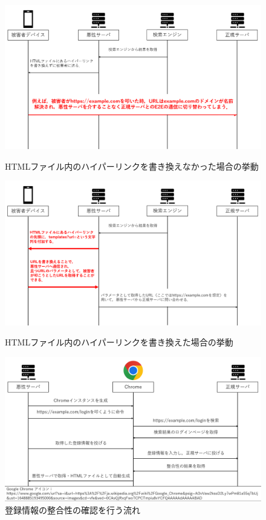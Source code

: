 \documentclass[dvipdfmx,twocolumn]{jsarticle}
\begin{document}
                \begin{figure}[t]
                    \centering
                    \includegraphics[width=12cm]{img/vc-vf-4-5-00.png}
                    \caption{HTMLファイル内のハイパーリンクを書き換えなかった場合の挙動}
                    \label{flow-no45-00}
                    \includegraphics[width=12cm]{img/vc-vf-4-5-01.png}
                    \caption{HTMLファイル内のハイパーリンクを書き換えた場合の挙動}
                    \label{flow-no45-01}
                    \includegraphics[width=12cm]{img/vc-vf-6-7.png}
                    \caption{登録情報の整合性の確認を行う流れ}
                    \label{flow-6-7}
                \end{figure}
                \clearpage
\end{document}
